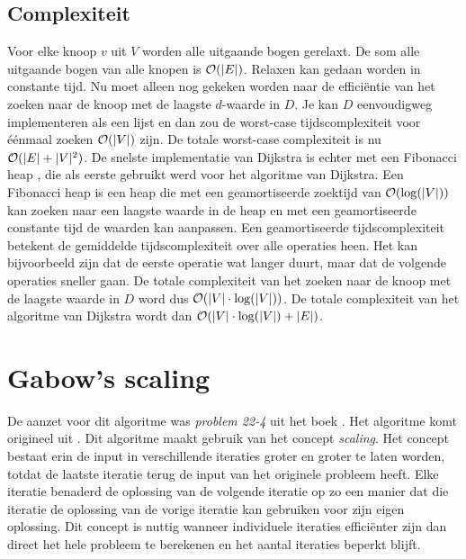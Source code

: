 \documentclass[conference]{IEEEtran}
\theoremstyle{definition}
\theoremstyle{remark}
\DeclarePairedDelimiter{\card}{\vert}{\vert}  %
\begin{document}
\subsection{Complexiteit}
Voor elke knoop $v$ uit $V$ worden alle uitgaande bogen gerelaxt. De som alle uitgaande bogen van alle knopen is $\mathcal{O}(\card{E})$. Relaxen kan gedaan worden in constante tijd. Nu moet alleen nog gekeken worden naar de efficiëntie van het zoeken naar de knoop met de laagste $d$-waarde in $D$. Je kan $D$ eenvoudigweg implementeren als een lijst en dan zou de worst-case tijdscomplexiteit voor éénmaal zoeken $\mathcal{O}(\card{V})$ zijn. De totale worst-case complexiteit is nu $\mathcal{O}(\card{E} + \card{V}^2)$.
De snelste implementatie van Dijkstra is echter met een Fibonacci heap \cite{Fibonacci}, die als eerste gebruikt werd voor het algoritme van Dijkstra. Een Fibonacci heap is een heap die met een geamortiseerde zoektijd van $\mathcal{O}(\log(\card{V}))$ kan zoeken naar een laagste waarde in de heap en met een geamortiseerde constante tijd de waarden kan aanpassen. Een geamortiseerde tijdscomplexiteit betekent de gemiddelde tijdscomplexiteit over alle operaties heen. Het kan bijvoorbeeld zijn dat de eerste operatie wat langer duurt, maar dat de volgende operaties sneller gaan. De totale complexiteit van het zoeken naar de knoop met de laagste waarde in $D$ word dus $\mathcal{O}(\card{V} \cdot \log(\card{V}))$. De totale complexiteit van het algoritme van Dijkstra wordt dan $\mathcal{O}(\card{V} \cdot \log(\card{V}) + \card{E})$.

\section{Gabow's scaling}
De aanzet voor dit algoritme was \textit{problem 22-4} uit het boek  \cite{Introduction}. Het algoritme komt origineel uit  \cite{Scaling}.
Dit algoritme maakt gebruik van het concept \textit{scaling}. Het concept bestaat erin de input in verschillende iteraties groter en groter te laten worden, totdat de laatste iteratie terug de input van het originele probleem heeft. Elke iteratie benaderd de oplossing van de volgende iteratie op zo een manier dat die iteratie de oplossing van de vorige iteratie kan gebruiken voor zijn eigen oplossing. Dit concept is nuttig wanneer individuele iteraties efficiënter zijn dan direct het hele probleem te berekenen en het aantal iteraties beperkt blijft.
\end{document}
